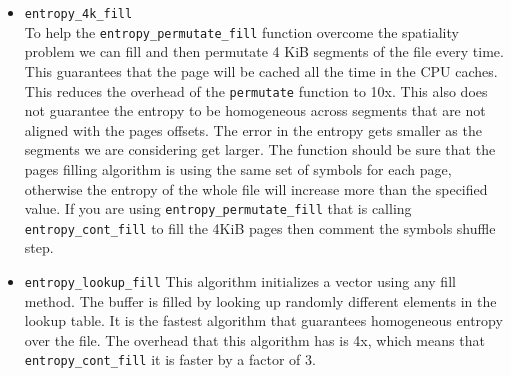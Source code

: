 \begin{itemize}
\item \verb+entropy_4k_fill+ \\
    To help the \verb+entropy_permutate_fill+ function overcome the spatiality problem we can fill and then permutate
    4 KiB segments of the file every time. This guarantees that the page will be cached all the time
    in the CPU caches. This reduces the overhead of the \verb+permutate+ function to 10x. This also does not guarantee
    the entropy to be homogeneous across segments that are not aligned with the pages offsets. The error in the entropy
    gets smaller as the segments we are considering get larger. The function should be sure that the pages filling
    algorithm is using the same set of symbols for each page, otherwise the entropy of the whole file will increase more than the specified value. If
    you are using \verb+entropy_permutate_fill+ that is calling \verb+entropy_cont_fill+  to fill the 4KiB pages then comment the 
    symbols shuffle step.

\item \verb+entropy_lookup_fill+
    This algorithm initializes a vector using any fill method.
    The buffer is filled by looking up randomly different elements
    in the lookup table. It is the fastest algorithm that guarantees
    homogeneous entropy over the file. The overhead that this algorithm has is 4x, which means
    that \verb+entropy_cont_fill+ it is faster by a factor of 3.
\end{itemize}


